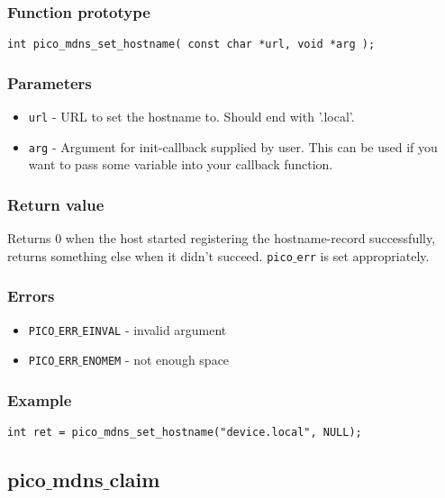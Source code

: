 \subsubsection*{Function prototype}
\begin{verbatim}
int pico_mdns_set_hostname( const char *url, void *arg );
\end{verbatim}

\subsubsection*{Parameters}
\begin{itemize}[noitemsep]
\item \texttt{url} - URL to set the hostname to. Should end with '.local'.
\item \texttt{arg} - Argument for init-callback supplied by user. This can be used if you want to pass some variable into your callback function.
\end{itemize}

\subsubsection*{Return value}
Returns 0 when the host started registering the hostname-record successfully, returns something else when it didn't succeed. \texttt{pico$\_$err} is set appropriately.

\subsubsection*{Errors}
\begin{itemize}[noitemsep]
\item \texttt{PICO$\_$ERR$\_$EINVAL} - invalid argument
\item \texttt{PICO$\_$ERR$\_$ENOMEM} - not enough space
\end{itemize}

\subsubsection*{Example}
\begin{verbatim}
int ret = pico_mdns_set_hostname("device.local", NULL);
\end{verbatim}


\subsection{pico$\_$mdns$\_$claim}

